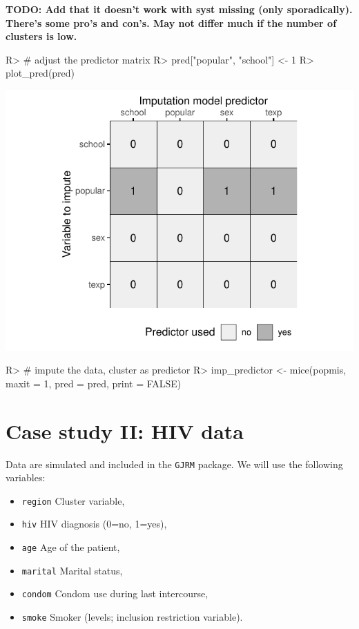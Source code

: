 \documentclass[
]{jss}
\providecommand{\tightlist}{%
  \setlength{\itemsep}{0pt}\setlength{\parskip}{0pt}}
\begin{document}
\textbf{TODO: Add that it doesn't work with syst missing (only
sporadically). There's some pro's and con's. May not differ much if the
number of clusters is low.}

\begin{CodeChunk}
\begin{CodeInput}
R> # adjust the predictor matrix
R> pred["popular", "school"] <- 1 
R> plot_pred(pred)
\end{CodeInput}


\begin{center}\includegraphics{Imputation_of_Incomplete_Multilevel_Data_files/figure-latex/pop_predictor-1} \end{center}

\begin{CodeInput}
R> # impute the data, cluster as predictor
R> imp_predictor <- mice(popmis, maxit = 1, pred = pred, print = FALSE)
\end{CodeInput}
\end{CodeChunk}

\hypertarget{case-study-ii-hiv-data}{%
\section{Case study II: HIV data}\label{case-study-ii-hiv-data}}

Data are simulated and included in the \texttt{GJRM} package. We will
use the following variables:

\begin{itemize}
\tightlist
\item
  \texttt{region} Cluster variable,
\item
  \texttt{hiv} HIV diagnosis (0=no, 1=yes),
\item
  \texttt{age} Age of the patient,
\item
  \texttt{marital} Marital status,
\item
  \texttt{condom} Condom use during last intercourse,
\item
  \texttt{smoke} Smoker (levels; inclusion restriction variable).
\end{itemize}
\end{document}
